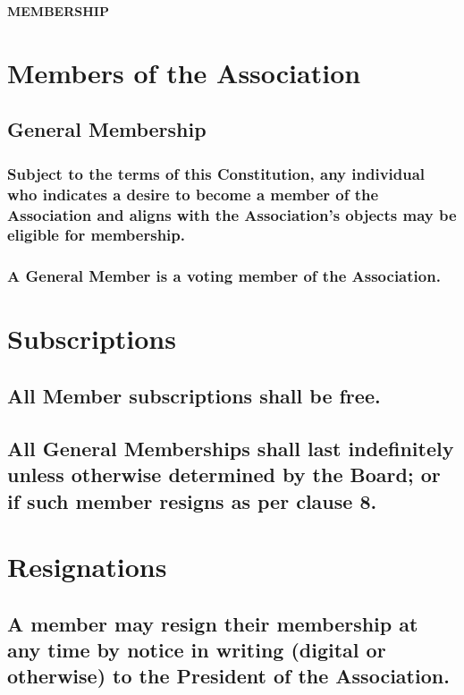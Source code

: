 \documentclass{article}
\newenvironment{subs}
  {\adjustwidth{2em}{0pt}}
  {\endadjustwidth}
\begin{document}
\vspace{5mm}
{\large\bf MEMBERSHIP\par}
\hrulefill
\vspace{5mm}

\section{Members of the Association}
\begin{subs}
\subsection{General Membership}

\begin{subs}
\subsubsection{Subject to the terms of this Constitution, any individual who indicates a desire to become a member of the Association and aligns with the Association's objects may be eligible for membership.}
\subsubsection{A General Member is a voting member of the Association.}
\end{subs}
\end{subs}

\section{Subscriptions}
\begin{subs}
\subsection{All Member subscriptions shall be free.}
\subsection{All General Memberships shall last indefinitely unless otherwise determined by the Board; or if such member resigns as per clause 8.}
\end{subs}

\section{Resignations}
\begin{subs}
\subsection{A member may resign their membership at any time by notice in writing (digital or otherwise) to the President of the Association.}
\end{subs}
 
\end{document}
